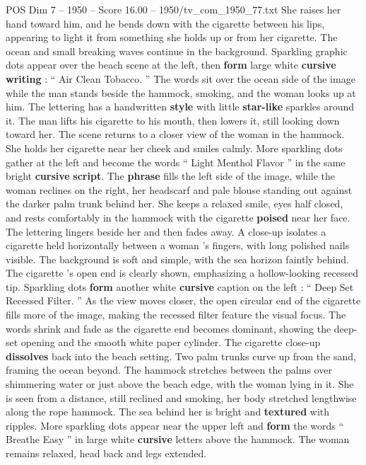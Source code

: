 \begin{textsample}{POS Dim 7 – 1950 – Score 16.00 – 1950/tv\_com\_1950\_77.txt}
She raises her hand toward him, and he bends down with the cigarette between his lips, appearing to light it from something she holds up or from her cigarette.
The ocean and small breaking waves continue in the background.
Sparkling graphic dots appear over the beach scene at the left, then \textbf{form} large white \textbf{cursive} \textbf{writing} : “ Air Clean Tobacco. ” The words sit over the ocean side of the image while the man stands beside the hammock, smoking, and the woman looks up at him.
The lettering has a handwritten \textbf{style} with little \textbf{star-like} sparkles around it.
The man lifts his cigarette to his mouth, then lowers it, still looking down toward her.
The scene returns to a closer view of the woman in the hammock.
She holds her cigarette near her cheek and smiles calmly.
More sparkling dots gather at the left and become the words “ Light Menthol Flavor ” in the same bright \textbf{cursive} \textbf{script}.
The \textbf{phrase} fills the left side of the image, while the woman reclines on the right, her headscarf and pale blouse standing out against the darker palm trunk behind her.
She keeps a relaxed smile, eyes half closed, and rests comfortably in the hammock with the cigarette \textbf{poised} near her face.
The lettering lingers beside her and then fades away.
A close-up isolates a cigarette held horizontally between a woman ’s fingers, with long polished nails visible.
The background is soft and simple, with the sea horizon faintly behind.
The cigarette ’s open end is clearly shown, emphasizing a hollow-looking recessed tip.
Sparkling dots \textbf{form} another white \textbf{cursive} caption on the left : “ Deep Set Recessed Filter. ” As the view moves closer, the open circular end of the cigarette fills more of the image, making the recessed filter feature the visual focus.
The words shrink and fade as the cigarette end becomes dominant, showing the deep-set opening and the smooth white paper cylinder.
The cigarette close-up \textbf{dissolves} back into the beach setting.
Two palm trunks curve up from the sand, framing the ocean beyond.
The hammock stretches between the palms over shimmering water or just above the beach edge, with the woman lying in it.
She is seen from a distance, still reclined and smoking, her body stretched lengthwise along the rope hammock.
The sea behind her is bright and \textbf{textured} with ripples.
More sparkling dots appear near the upper left and \textbf{form} the words “ Breathe Easy ” in large white \textbf{cursive} letters above the hammock.
The woman remains relaxed, head back and legs extended.

\end{textsample}
